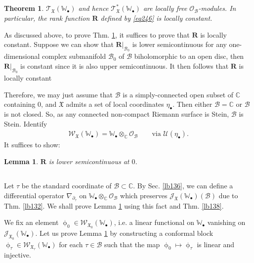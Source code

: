 \documentclass[11pt,b5paper,notitlepage]{article}
\theoremstyle{definition}
\theoremstyle{plain}
\newtheorem{thm}[df]{Theorem}
\newtheorem{lm}[df]{Lemma}
\newcommand{\fk}{\mathfrak}
\newcommand{\mc}{\mathcal}
\newcommand{\scr}{\mathscr}
\newcommand{\blt}{\bullet}
\newcommand{\Wbb}{\mathbb W}
\newcommand{\Cbb}{\mathbb C}
\newcommand{\Rbf}{\mathbf R}
\numberwithin{equation}{section}
\begin{document}
\subsection{}

\begin{thm}\label{lb135}
$\scr T_{\fk X}(\Wbb_\blt)$ and hence $\scr T_{\fk X}^*(\Wbb_\blt)$ are locally free $\scr O_{\mc B}$-modules. In particular, the rank function $\Rbf$ defined by \eqref{eq246} is locally constant.
\end{thm}

As discussed above, to prove Thm. \ref{lb135}, it suffices to prove that $\Rbf$ is locally constant. Suppose we can show that $\Rbf|_{\mc B_0}$ is lower semicontinuous for any one-dimensional complex submanifold $\mc B_0$ of $\mc B$ biholomorphic to an open disc, then $\Rbf|_{\mc B_0}$ is constant since it is also upper semicontinuous. It then follows that $\Rbf$ is locally constant

Therefore, we may just assume that $\mc B$ is a simply-connected open subset of $\Cbb$ containing $0$, and $\fk X$ admits a set of local coordinates $\eta_\blt$. Then either $\mc B=\Cbb$ or $\mc B$ is not closed. So, as any connected non-compact Riemann surface is Stein, $\mc B$ is Stein.  Identify
\begin{align*}
\scr W_{\fk X}(\Wbb_\blt)=\Wbb_\blt\otimes_\Cbb\scr O_{\mc B}\qquad\text{via }\mc U(\eta_\blt).
\end{align*}
It suffices to show: 

\begin{lm}\label{lb137}
$\Rbf$ is lower semicontinuous at $0$.
\end{lm}
 






\subsection{}


Let $\tau$ be the standard coordinate of $\mc B\subset\Cbb$. By Sec. \ref{lb136}, we can define a differential operator $\nabla_{\partial_\tau}$ on $\Wbb_\blt\otimes_\Cbb\scr O_{\mc B}$ which preserves $\scr J_{\fk X}(\Wbb_\blt)(\mc B)$ due to Thm. \ref{lb132}. We shall prove Lemma \ref{lb137} using this fact and Thm. \ref{lb138}.

We fix an element $\upphi_0\in\scr W_{\fk X_0}(\Wbb_\blt)$, i.e.  a linear functional on $\Wbb_\blt$ vanishing on $\scr J_{\fk X_0}(\Wbb_\blt)$. Let us prove Lemma \ref{lb137} by constructing a conformal block $\upphi_\tau\in\scr W_{\fk X_\tau}(\Wbb_\blt)$  for each $\tau\in\mc B$ such that  the map $\upphi_0\mapsto \upphi_\tau$ is linear and injective.
\end{document}
